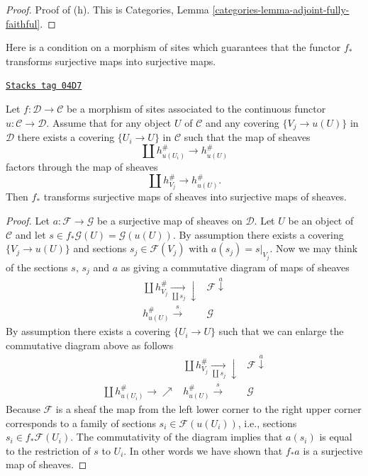 \begin{proof}
\medskip\noindent
Proof of (h). This is
Categories, Lemma \ref{categories-lemma-adjoint-fully-faithful}.
\end{proof}

Here is a condition on a morphism of sites which guarantees that
the functor $f_*$ transforms surjective maps into surjective maps.

\begin{lemma}[Weaker]
\label{sites-lemma-weaker}
\href{https://stacks.math.columbia.edu/tag/04D7}{\texttt{Stacks tag 04D7}}

Let $f : \mathcal{D} \to \mathcal{C}$ be a morphism of sites associated to
the continuous functor $u : \mathcal{C} \to \mathcal{D}$.
Assume that for any object $U$ of $\mathcal{C}$ and any covering
$\{V_j \to u(U)\}$ in $\mathcal{D}$ there exists a covering $\{U_i \to U\}$
in $\mathcal{C}$ such that the map of sheaves
$$
\coprod h_{u(U_i)}^\# \to h_{u(U)}^\#
$$
factors through the map of sheaves
$$
\coprod h_{V_j}^\# \to h_{u(U)}^\#.
$$
Then $f_*$ transforms surjective maps of sheaves into surjective maps of
sheaves.
\end{lemma}

\begin{proof}
Let $a : \mathcal{F} \to \mathcal{G}$ be a surjective map of sheaves on
$\mathcal{D}$. Let $U$ be an object of $\mathcal{C}$ and let
$s \in f_*\mathcal{G}(U) = \mathcal{G}(u(U))$. By assumption there exists
a covering $\{V_j \to u(U)\}$ and sections $s_j \in \mathcal{F}(V_j)$
with $a(s_j) = s|_{V_j}$. Now we may think of the sections $s$,
$s_j$ and $a$ as giving a commutative diagram of maps of sheaves
$$
\begin{array}{cc}\coprod h_{V_j}^\# \underset{\coprod s_j}{\longrightarrow}\downarrow & \mathcal{F} \overset{a}{\downarrow} \\ h_{u(U)}^\# \overset{s}{\longrightarrow} & \mathcal{G}\end{array}
$$
By assumption there exists a covering $\{U_i \to U\}$ such that we can
enlarge the commutative diagram above as follows
$$
\begin{array}{ccc} & \coprod h_{V_j}^\# \underset{\coprod s_j}{\longrightarrow}\downarrow & \mathcal{F} \overset{a}{\downarrow} \\ \coprod h_{u(U_i)}^\# \longrightarrow\nearrow & h_{u(U)}^\# \overset{s}{\longrightarrow} & \mathcal{G}\end{array}
$$
Because $\mathcal{F}$ is a sheaf the map from the left lower corner to
the right upper corner corresponds to a family of sections
$s_i \in \mathcal{F}(u(U_i))$, i.e., sections $s_i \in f_*\mathcal{F}(U_i)$.
The commutativity of the diagram implies that $a(s_i)$ is equal to the
restriction of $s$ to $U_i$. In other words we have shown that $f_*a$ is a
surjective map of sheaves.
\end{proof}

